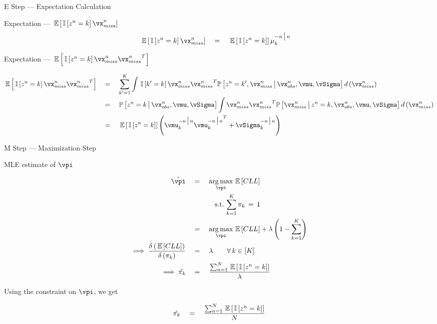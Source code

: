 \documentclass{article}
\begin{document}
\begin{question}
\begin{qsection}{E Step --- Expectation Calculation}
\begin{qsubsection}{Expectation --- $\E{\is{z^n = k} \vx_{miss}^n}$}
			\begin{align*}
				\E{\is{z^n = k} \vx_{miss}^n}	&\eq	\E{\is{z^n = k}} \mu_k^{-n \pipe n}
			\end{align*}
			
		\end{qsubsection}

		\begin{qsubsection}{Expectation --- $\E{\is{z^n = k} \vx_{miss}^n {\vx_{miss}^n}^T}$}

			\begin{align*}
				\E{\is{z^n = k} \vx_{miss}^n {\vx_{miss}^n}^T}	&\eq	\sum_{\pr{k} = 1}^{K} \int \is{\pr{k} = k} \vx_{miss}^n {\vx_{miss}^n}^T \prob{z^n = \pr{k}, \vx_{miss}^n \pipe \vx_{obs}^n, \vmu, \vSigma} d \para{\vx_{miss}^n} \\
																&\eq	\prob{z^n = k \pipe \vx_{obs}^n, \vmu, \vSigma} \int \vx_{miss}^n {\vx_{miss}^n}^T \prob{\vx_{miss}^n \pipe z^n = k, \vx_{obs}^n, \vmu, \vSigma} d \para{\vx_{miss}^n} \\
																&\eq	\E{\is{z^n = k}} \para{\vmu_k^{-n \pipe n} {\vmu_k^{-n \pipe n}}^T + \vSigma_k^{-n \pipe n}}
			\end{align*}
			
		\end{qsubsection}

	\end{qsection}

	\begin{qsection}{M Step --- Maximization Step}

		\begin{qsubsection}{MLE estimate of $\vpi$}

			\begin{align*}
				\hat{\vpi}						&\eq 	\argmax_{\vpi} \E{CLL} \\
												&\quad \quad \quad \quad \mt{s.t.} \sum_{k = 1}^{K} \pi_k \,=\, 1 \\
												&\eq 	\argmax_{\vpi} \E{CLL} + \lambda \para{1 - \sum_{k = 1}^{K}} \\
				\implies \derp{\E{CLL}}{\pi_k} 	&\eq	\lambda	\quad \quad \forall\, k \in \brac{K} \\
				\implies \hat{\pi_k}			&\eq	\frac{\sum_{n = 1}^{N} \E{\is{z^n = k}}}{\lambda}
			\end{align*}

			Using the constraint on $\vpi$, we get

			\begin{align*}
				\hat{\pi_k}	\eq	\frac{\sum_{n = 1}^{N} \E{\is{z^n = k}}}{N}
			\end{align*}


\end{qsubsection}
\end{qsection}
\end{question}
\end{document}
